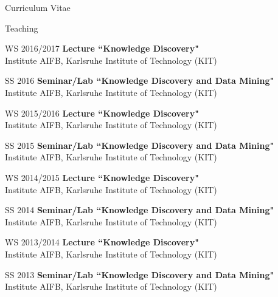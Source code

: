\begin{cv}{\centerline{\LARGE Curriculum Vitae}}
\setlength{\cvlabelwidth}{47mm} 
  \begin{cvlist}{Teaching}
  \item[WS 2016/2017] \textbf{Lecture ``Knowledge Discovery"} \\
  Institute AIFB, Karlsruhe Institute of Technology (KIT)
  \item[SS 2016] \textbf{Seminar/Lab ``Knowledge Discovery and Data Mining"} \\
  Institute AIFB, Karlsruhe Institute of Technology (KIT)
  \item[WS 2015/2016] \textbf{Lecture ``Knowledge Discovery"} \\
  Institute AIFB, Karlsruhe Institute of Technology (KIT)
  \item[SS 2015] \textbf{Seminar/Lab ``Knowledge Discovery and Data Mining"} \\
  Institute AIFB, Karlsruhe Institute of Technology (KIT)
  \item[WS 2014/2015] \textbf{Lecture ``Knowledge Discovery"} \\
  Institute AIFB, Karlsruhe Institute of Technology (KIT)
  \item[SS 2014] \textbf{Seminar/Lab ``Knowledge Discovery and Data Mining"} \\
  Institute AIFB, Karlsruhe Institute of Technology (KIT)
  \item[WS 2013/2014] \textbf{Lecture ``Knowledge Discovery"} \\
  Institute AIFB, Karlsruhe Institute of Technology (KIT)
  \item[SS 2013] \textbf{Seminar/Lab ``Knowledge Discovery and Data Mining"} \\
  Institute AIFB, Karlsruhe Institute of Technology (KIT)
  \end{cvlist}


\end{cv}
